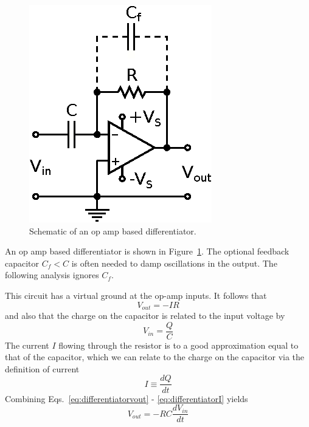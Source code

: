 \documentclass[11pt]{article}
\begin{document}
\begin{figure}[h!]
  \begin{center}
    \includegraphics{differentiator.eps}
    \caption{Schematic of an op amp based differentiator.}
    \label{fig:differentiator}
  \end{center}
\end{figure}

An op amp based differentiator is shown in
Figure~\ref{fig:differentiator}. The optional feedback capacitor $C_f
< C$ is often needed to damp oscillations in the output. The following
analysis ignores $C_f$.

This circuit has a virtual ground at the op-amp inputs. It follows
that
\begin{equation}
  \label{eq:differentiatorvout}
  V_{out} = - IR
\end{equation}
and also that the charge on the capacitor is related to the input
voltage by
\begin{equation}
  V_{in} = \frac{Q}{C}
\end{equation}
The current $I$ flowing through the resistor is to a good
approximation equal to that of the capacitor, which we can relate to
the charge on the capacitor via the definition of current
\begin{equation}
  \label{eq:differentiatorI}
  I \equiv \frac{dQ}{dt}
\end{equation}
Combining Eqs.~\ref{eq:differentiatorvout} - \ref{eq:differentiatorI}
yields
\begin{equation}
  \label{eq:opampdiff}
  V_{out} = - RC \frac{d V_{in}}{dt}
\end{equation}
\end{document}
